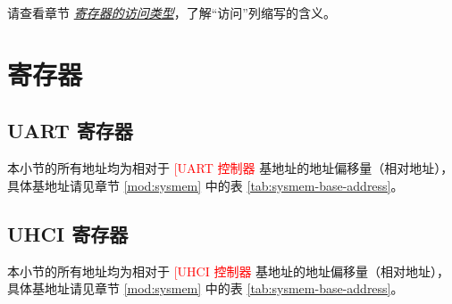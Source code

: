 \documentclass[main\_\_CN.tex]{subfiles}
\begin{document}
请查看章节 \hyperref[glossary-access-types]{\textit{寄存器的访问类型}}，了解“访问”列缩写的含义。






\clearpage
\section{寄存器}

\subsection{UART 寄存器}

本小节的所有地址均为相对于 \textcolor{red}{[UART 控制器} 基地址的地址偏移量（相对地址），具体基地址请见章节 \ref{mod:sysmem} \textit{} 中的表 \ref{tab:sysmem-base-address}。



\subsection{UHCI 寄存器}

本小节的所有地址均为相对于 \textcolor{red}{[UHCI 控制器} 基地址的地址偏移量（相对地址），具体基地址请见章节 \ref{mod:sysmem} \textit{} 中的表 \ref{tab:sysmem-base-address}。


\end{document}
